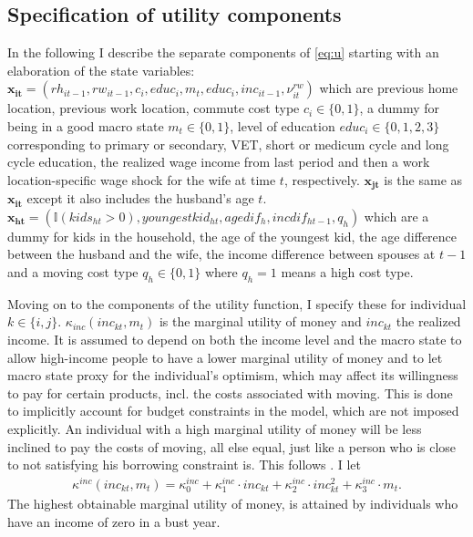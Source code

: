 \subsection{Specification of utility components}\label{subsec:utilcomp}
In the following I describe the separate components of \eqref{eq:u} starting with an elaboration of the state variables: $\boldsymbol{x_{it}}=(rh_{it-1},rw_{it-1},c_i,educ_i,m_t,educ_i,inc_{it-1},\nu_{it}^{rw})$ which are previous home location, previous work location, commute cost type $c_i\in\{0,1\}$, a dummy for being in a good macro state $m_t\in\{0,1\}$, level of education $educ_{i}\in\{0,1,2,3\}$ corresponding to primary or secondary, VET, short or medicum cycle and long cycle education, the realized wage income from last period and then a work location-specific wage shock for the wife at time $t$, respectively. $\boldsymbol{x_{jt}}$ is the same as $\boldsymbol{x_{it}}$ except it also includes the husband's age $t$. ${\boldsymbol{x_{ht}}}=(\mathbb{I}{(kids_{ht}>0)},youngestkid_{ht},agedif_h,incdif_{ht-1},q_h)$ which are a dummy for kids in the household, the age of the youngest kid, the age difference between the husband and the wife, the income difference between spouses at $t-1$ and a moving cost type $q_h\in\{0,1\}$ where $q_h=1$ means a high cost type. 

Moving on to the components of the utility function, I specify these for individual $k\in\{i,j\}$. $\kappa_{inc}(inc_{kt},m_t)$ is the marginal utility of money and $inc_{kt}$ the realized income. It is assumed to depend on both the income level and the macro state to allow high-income people to have a lower marginal utility of money and to let macro state proxy for the individual's optimism, which may affect its willingness to pay for certain products, incl. the costs associated with moving. This is done to implicitly account for budget constraints in the model, which are not imposed explicitly. An individual with a high marginal utility of money will be less inclined to pay the costs of moving, all else equal, just like a person who is close to not satisfying his borrowing constraint is. This follows \citet{GillinghamEtAl2015}. I let
\begin{align*}
\kappa^{inc}(inc_{kt},m_t)=\kappa_0^{inc}+\kappa_1^{inc}\cdot inc_{kt}+\kappa_2^{inc}\cdot inc_{kt}^2+\kappa_3^{inc}\cdot m_t.
\end{align*}
The highest obtainable marginal utility of money, is attained by individuals who have an income of zero in a bust year. 

